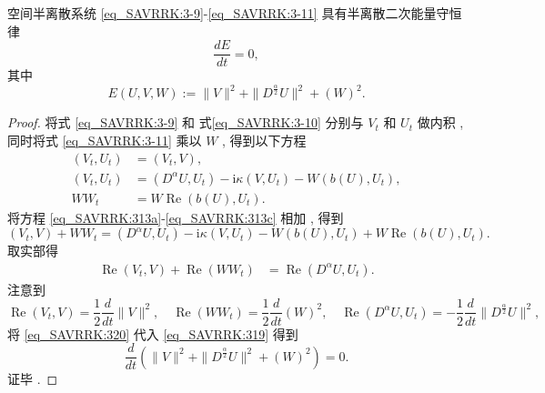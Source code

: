 \begin{theorem}	\label{thm3}
空间半离散系统 \eqref{eq_SAVRRK:3-9}-\eqref{eq_SAVRRK:3-11} 具有半离散二次能量守恒律
\begin{equation}
\frac{dE}{dt}=0 , \label{eq_SAVRRK:313a}
\end{equation}
其中
\begin{equation}
E(U , V , W):=\|V\|^2 + \|D^\frac{\alpha}{2} U\|^2+\left(W\right)^2 . \label{eq_SAVRRK:313}
\end{equation}
\end{theorem}

\begin{proof}
	将式 \eqref{eq_SAVRRK:3-9} 和 式\eqref{eq_SAVRRK:3-10} 分别与 $V_t$ 和 $U_t$ 做内积 , 
	同时将式 \eqref{eq_SAVRRK:3-11} 乘以 $W$ , 得到以下方程
\begin{align}
\left(V_t , U_t\right)&=\left(V_t , V\right) , \label{eq_SAVRRK:313a}\\
\left(V_t , U_t\right)&=\left(D^{\alpha} U , U_t\right)-\mathrm{i} \kappa\left(V , U_t\right)-W\left(b(U) , U_t\right) , \label{eq_SAVRRK:313b}\\
W W_t&=W\operatorname{Re}\left(b(U) , U_t\right) . \label{eq_SAVRRK:313c}
\end{align}
将方程 \eqref{eq_SAVRRK:313a}-\eqref{eq_SAVRRK:313c} 相加 , 得到
\begin{equation}
\left(V_t , V\right) + W W_t= \left(D^{\alpha} U , U_t\right)-\mathrm{i} \kappa\left(V , U_t\right)-W\left(b(U) , U_t\right) + W\operatorname{Re}\left(b(U) , U_t\right) . 
\end{equation}
取实部得
\begin{align}
\operatorname{Re}\left(V_t , V\right) + \operatorname{Re}\left(W W_t\right)&= \operatorname{Re}\left(D^{\alpha} U , U_t\right) . \label{eq_SAVRRK:319}
\end{align}
注意到
\begin{equation}
\operatorname{Re}\left(V_t , V\right) = \frac{1}{2}\frac{d }{d t}\|V\|^2 , \quad \operatorname{Re}\left(W W_t\right) = \frac{1}{2}\frac{d }{d t}\left(W\right)^2 , \quad \operatorname{Re}\left(D^{\alpha} U , U_t\right)=-\frac{1}{2}\frac{d }{d t}\|D^\frac{\alpha}{2}U\|^2 , \label{eq_SAVRRK:320}
\end{equation}
将 \eqref{eq_SAVRRK:320} 代入 \eqref{eq_SAVRRK:319} 得到
\begin{equation}
\frac{d }{d t}\left(\|V\|^2+\|D^\frac{\alpha}{2}U\|^2+\left(W\right)^2\right)=0 . 
\end{equation}
证毕 . 
\end{proof}

